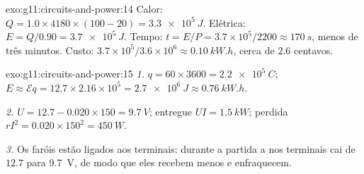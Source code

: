 \begin{solution}{exo:g11:circuits-and-power:14}
Calor: $Q = 1.0 \times 4180 \times (100 - 20) = \qty{3.3e5}{J}$.
Elétrica: $E = Q/0.90 = \qty{3.7e5}{J}$. Tempo:
$t = E/P = 3.7\times10^{5}/2200 \approx \qty{170}{s}$, menos de três
minutos. Custo:
$3.7\times10^{5}/3.6\times10^{6} \approx \qty{0.10}{kW.h}$, cerca de
$2.6$ centavos.
\end{solution}

\begin{solution}{exo:g11:circuits-and-power:15}
\emph{1.} $q = 60 \times 3600 = \qty{2.2e5}{C}$;
$E \approx \mathcal{E}q = 12.7 \times 2.16\times10^{5} = \qty{2.7e6}{J}
\approx \qty{0.76}{kW.h}$.

\emph{2.} $U = 12.7 - 0.020 \times 150 = \qty{9.7}{V}$; entregue
$UI = \qty{1.5}{kW}$; perdida $rI^2 = 0.020 \times 150^2 =
\qty{450}{W}$.

\emph{3.} Os faróis estão ligados aos terminais: durante a partida a
 nos terminais cai de $12.7$ para \qty{9.7}{V}, de modo que eles
recebem menos  e enfraquecem.
\end{solution}


